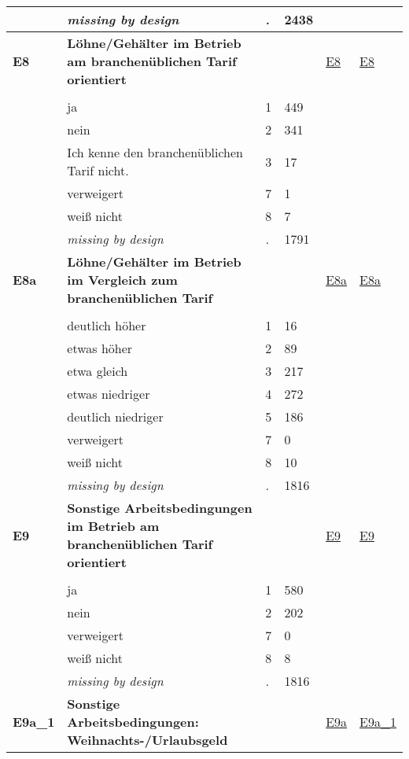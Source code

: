 \begin{longtable}{| L{2.45cm} | L{6cm} | C{1.5cm} | R{1cm} | C{2.25cm} | C{2.25cm} |}
   & \textit{missing by design} & \textit{.} & 2438 &  &  \\ 
   \midrule
\textbf{E8}\label{var:E8} & \textbf{Löhne/Gehälter im Betrieb am branchenüblichen Tarif orientiert} &  &  & \hyperref[E8]{E8} & \hyperref[var:suf:E8]{E8} \\ 
   &  &  &  &  &  \\ 
   & ja & 1 & 449 &  &  \\ 
   & nein & 2 & 341 &  &  \\ 
   & Ich kenne den branchenüblichen Tarif nicht. & 3 & 17 &  &  \\ 
   & verweigert & 7 & 1 &  &  \\ 
   & weiß nicht & 8 & 7 &  &  \\ 
   & \textit{missing by design} & \textit{.} & 1791 &  &  \\ 
   \midrule
\textbf{E8a}\label{var:E8a} & \textbf{Löhne/Gehälter im Betrieb im Vergleich zum branchenüblichen Tarif} &  &  & \hyperref[E8a]{E8a} & \hyperref[var:suf:E8a]{E8a} \\ 
   &  &  &  &  &  \\ 
   & deutlich höher & 1 & 16 &  &  \\ 
   & etwas höher & 2 & 89 &  &  \\ 
   & etwa gleich & 3 & 217 &  &  \\ 
   & etwas niedriger & 4 & 272 &  &  \\ 
   & deutlich niedriger & 5 & 186 &  &  \\ 
   & verweigert & 7 & 0 &  &  \\ 
   & weiß nicht & 8 & 10 &  &  \\ 
   & \textit{missing by design} & \textit{.} & 1816 &  &  \\ 
   \midrule
\textbf{E9}\label{var:E9} & \textbf{Sonstige Arbeitsbedingungen im Betrieb am branchenüblichen Tarif orientiert} &  &  & \hyperref[E9]{E9} & \hyperref[var:suf:E9]{E9} \\ 
   &  &  &  &  &  \\ 
   & ja & 1 & 580 &  &  \\ 
   & nein & 2 & 202 &  &  \\ 
   & verweigert & 7 & 0 &  &  \\ 
   & weiß nicht & 8 & 8 &  &  \\ 
   & \textit{missing by design} & \textit{.} & 1816 &  &  \\ 
   \midrule
\textbf{E9a\_1}\label{var:E9a:1} & \textbf{Sonstige Arbeitsbedingungen: Weihnachts-/Urlaubsgeld} &  &  & \hyperref[E9a]{E9a} & \hyperref[var:suf:E9a:1]{E9a\_1} \\ 

\end{longtable}
